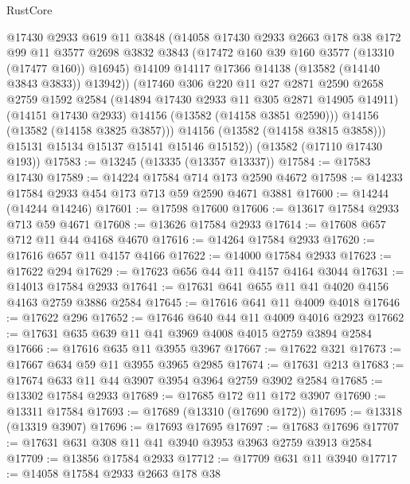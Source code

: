 \begin{lexlean}{RustCore}
\begin{coremodule}
              @17430
              @2933
              @619
              @11
              @3848
              (@14058
                @17430
                @2933
                @2663
                @178
                @38
                @172
                @99
                @11
                @3577
                @2698
                @3832
                @3843
                (@17472 @160 @39 @160 @3577 (@13310 (@17477 @160)) @16945)
                @14109
                @14117
                @17366
                @14138
                (@13582 (@14140 @3843 @3833))
                @13942))
            (@17460
              @306
              @220
              @11
              @27
              @2871
              @2590
              @2658
              @2759
              @1592
              @2584
              (@14894 @17430 @2933 @11 @305 @2871 @14905 @14911)
              (@14151 @17430 @2933)
              @14156
              (@13582 (@14158 @3851 @2590)))
            @14156
            (@13582 (@14158 @3825 @3857)))
          @14156
          (@13582 (@14158 @3815 @3858)))
        @15131
        @15134
        @15137
        @15141
        @15146
        @15152))
    (@13582 (@17110 @17430 @193))
@17583 := @13245 (@13335 (@13357 @13337))
@17584 := @17583 @17430
@17589 := @14224 @17584 @714 @173 @2590 @4672
@17598 := @14233 @17584 @2933 @454 @173 @713 @59 @2590 @4671 @3881
@17600 := @14244 (@14244 @14246)
@17601 := @17598 @17600
@17606 := @13617 @17584 @2933 @713 @59 @4671
@17608 := @13626 @17584 @2933
@17614 := @17608 @657 @712 @11 @44 @4168 @4670
@17616 := @14264 @17584 @2933
@17620 := @17616 @657 @11 @4157 @4166
@17622 := @14000 @17584 @2933
@17623 := @17622 @294
@17629 := @17623 @656 @44 @11 @4157 @4164 @3044
@17631 := @14013 @17584 @2933
@17641 := @17631 @641 @655 @11 @41 @4020 @4156 @4163 @2759 @3886 @2584
@17645 := @17616 @641 @11 @4009 @4018
@17646 := @17622 @296
@17652 := @17646 @640 @44 @11 @4009 @4016 @2923
@17662 := @17631 @635 @639 @11 @41 @3969 @4008 @4015 @2759 @3894 @2584
@17666 := @17616 @635 @11 @3955 @3967
@17667 := @17622 @321
@17673 := @17667 @634 @59 @11 @3955 @3965 @2985
@17674 := @17631 @213
@17683 := @17674 @633 @11 @44 @3907 @3954 @3964 @2759 @3902 @2584
@17685 := @13302 @17584 @2933
@17689 := @17685 @172 @11 @172 @3907
@17690 := @13311 @17584
@17693 := @17689 (@13310 (@17690 @172))
@17695 := @13318 (@13319 @3907)
@17696 := @17693 @17695
@17697 := @17683 @17696
@17707 := @17631 @631 @308 @11 @41 @3940 @3953 @3963 @2759 @3913 @2584
@17709 := @13856 @17584 @2933
@17712 := @17709 @631 @11 @3940
@17717 := @14058 @17584 @2933 @2663 @178 @38

\end{coremodule}
\end{lexlean}
